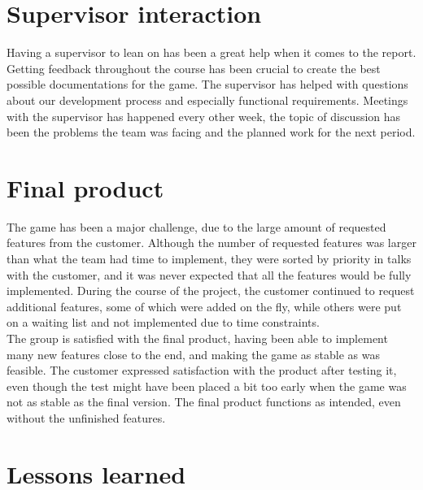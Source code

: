 \section{Supervisor interaction}
Having a supervisor to lean on has been a great help when it comes to the report. Getting feedback throughout the course has been crucial to create the best possible documentations for the game. The supervisor has helped with questions about our development process and especially functional requirements. Meetings with the supervisor has happened every other week, the topic of discussion has been the problems the team was facing and the planned work for the next period. 

\section{Final product}

The game has been a major challenge, due to the large amount of requested features from the customer. Although the number of requested features was larger than what the team had time to implement, they were sorted by priority in talks with the customer, and it was never expected that all the features would be fully implemented. During the course of the project, the customer continued to request additional features, some of which were added on the fly, while others were put on a waiting list and not implemented due to time constraints.\\
\newline
The group is satisfied with the final product, having been able to implement many new features close to the end, and making the game as stable as was feasible. The customer expressed satisfaction with the product after testing it, even though the test might have been placed a bit too early when the game was not as stable as the final version. The final product functions as intended, even without the unfinished features.\\

\section{Lessons learned}

